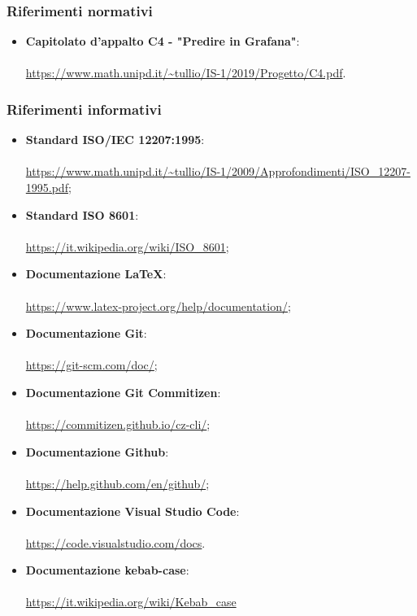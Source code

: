 \documentclass[../norme-di-progetto.tex]{subfiles}
\begin{document}
\subsubsection{Riferimenti normativi}
\begin{itemize}
  \item \textbf{Capitolato d'appalto C4 - "Predire in Grafana"}: \\ \\ \href{https://www.math.unipd.it/~tullio/IS-1/2019/Progetto/C4.pdf}{https://www.math.unipd.it/\textasciitilde tullio/IS-1/2019/Progetto/C4.pdf}.
\end{itemize}

\subsubsection{Riferimenti informativi}
\begin{itemize}
  \item \textbf{Standard ISO/IEC 12207:1995}: \\ \\ \href{https://www.math.unipd.it/~tullio/IS-1/2009/Approfondimenti/ISO_12207-1995.pdf}{https://www.math.unipd.it/\textasciitilde tullio/IS-1/2009/Approfondimenti/ISO\_12207-1995.pdf};
  \item \textbf{Standard ISO 8601}: \\ \\ \href{https://it.wikipedia.org/wiki/ISO_8601}{https://it.wikipedia.org/wiki/ISO\_8601};
\item \textbf{Documentazione \LaTeX}: \\ \\ \href{https://www.latex-project.org/help/documentation/}{https://www.latex-project.org/help/documentation/};
\item \textbf{Documentazione Git}: \\ \\ \href{https://git-scm.com/doc/}{https://git-scm.com/doc/};
\item \textbf{Documentazione Git Commitizen}: \\ \\ \href{https://commitizen.github.io/cz-cli/}{https://commitizen.github.io/cz-cli/};
\item \textbf{Documentazione Github}: \\ \\ \href{https://help.github.com/en/github/}{https://help.github.com/en/github/};
\item \textbf{Documentazione Visual Studio Code}: \\ \\ \href{https://code.visualstudio.com/docs}{https://code.visualstudio.com/docs}.
\item \textbf{Documentazione kebab-case}: \\ \\ \href{https://it.wikipedia.org/wiki/Kebab_case}{https://it.wikipedia.org/wiki/Kebab\_case}
\end{itemize}
\end{document}
